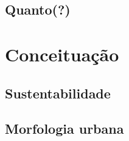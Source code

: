 \documentclass[]{report}
\begin{document}
\section{Quanto(?)}


\setcounter{secnumdepth}{1}
\chapter{Conceituação}

\section{Sustentabilidade}


\section{Morfologia urbana}
\end{document}
